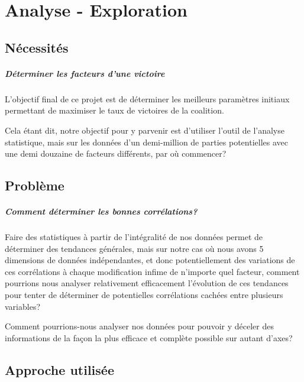 \chapter{Analyse - Exploration}

	\section{Nécessités}
	
		\paragraph{Déterminer les facteurs d'une victoire}
		L'objectif final de ce projet est de déterminer les meilleurs paramètres initiaux permettant de maximiser le taux de victoires de la coalition.
		
		Cela étant dit, notre objectif pour y parvenir est d'utiliser l'outil de l'analyse statistique, mais sur les données d'un demi-million de parties potentielles avec une demi douzaine de facteurs différents, par où commencer?
 
	
	\section{Problème}
		
		\paragraph{Comment déterminer les bonnes corrélations?}
		Faire des statistiques à partir de l'intégralité de nos données permet de déterminer des tendances générales, mais sur notre cas où nous avons 5 dimensions de données indépendantes, et donc potentiellement des variations de ces corrélations à chaque modification infime de n'importe quel facteur, comment pourrions nous analyser relativement efficacement l'évolution de ces tendances pour tenter de déterminer de potentielles corrélations cachées entre plusieurs variables?
		
	
		\begin{problem}
			Comment pourrions-nous analyser nos données pour pouvoir y déceler des informations de la façon la plus efficace et complète possible sur autant d'axes?
		\end{problem}
	
	\section{Approche utilisée}
	
